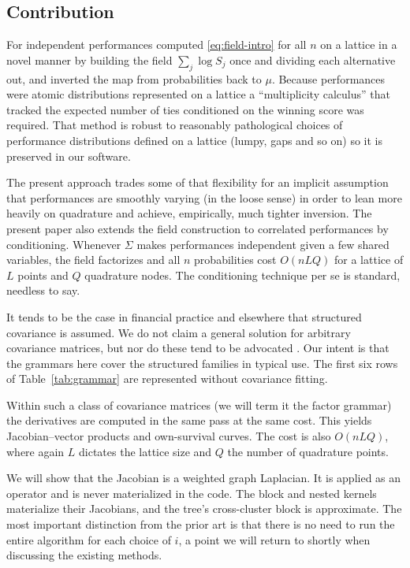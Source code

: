 \documentclass[11pt]{article}
\begin{document}
\subsection{Contribution}

For independent performances \citet{cotton2021} computed \eqref{eq:field-intro} for
all $n$ on a lattice in a novel manner by building the field $\sum_j \log S_j$ once and dividing
each alternative out, and inverted the map from probabilities back to $\mu$. Because performances were atomic distributions represented on a lattice a ``multiplicity calculus'' that tracked the expected number of ties conditioned on the winning score was required. That method is robust to reasonably pathological choices of performance distributions defined on a lattice (lumpy, gaps and so on) so it is preserved in our software.

The present approach trades some of that flexibility for an implicit assumption that performances are smoothly varying (in the loose sense) in order to lean more heavily on quadrature and achieve, empirically, much tighter inversion. The
present paper also extends the field construction to correlated performances by
conditioning. Whenever $\Sigma$ makes performances independent given a few shared variables, the field factorizes and all $n$ probabilities cost $O(nLQ)$ for a lattice of $L$ points and $Q$ quadrature nodes. The conditioning technique per se is standard, needless to say.

It tends to be the case in financial practice and elsewhere that structured covariance is assumed. We do not claim a general solution for arbitrary covariance matrices, but nor do these tend to be advocated \citep{train2009}. Our intent is that the grammars here cover the structured families in typical use. The first six rows of Table~\ref{tab:grammar} are represented without covariance fitting.


Within such a class of covariance matrices (we will term it the factor grammar) the derivatives are computed in the same pass at the same cost. This yields Jacobian--vector products and own-survival curves. The cost is also $O(nLQ)$, where again $L$ dictates the lattice size and $Q$ the number of quadrature points.

We will show that the Jacobian is a weighted graph Laplacian. It is applied as an operator and is never materialized in the code. The block and nested kernels materialize their Jacobians, and the tree's cross-cluster block is approximate. The most important distinction from the prior art is that there is no need to run the entire algorithm for each choice of $i$, a point we will return to shortly when discussing the existing methods.
\end{document}
